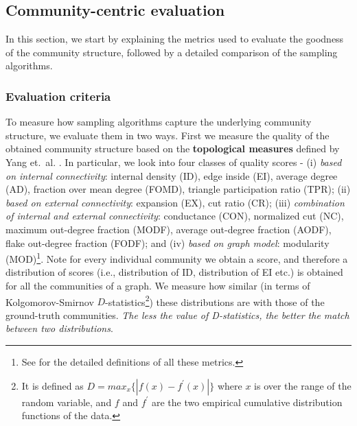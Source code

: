 \subsection{Community-centric evaluation}
In this section, we start by explaining the metrics used to evaluate the goodness of the community structure, followed by a detailed comparison of the sampling algorithms.
\subsubsection{Evaluation criteria}
To measure how sampling algorithms capture the underlying community structure, we evaluate them in two ways.  First we measure the quality of the obtained community structure based on the {\bf topological measures} defined by Yang et.~al.  \cite{yang2015defining}. In particular, we look into four classes of quality scores - (i) {\em based on internal connectivity}: internal density (ID), edge inside (EI), average degree (AD), fraction over mean degree (FOMD), triangle participation ratio (TPR); (ii) {\em based on external connectivity}: expansion (EX), cut ratio (CR); (iii) {\em combination of internal and external connectivity}: conductance (CON), normalized cut (NC), maximum out-degree fraction (MODF), average out-degree fraction (AODF), flake out-degree fraction (FODF); and (iv) {\em based on graph model}: modularity (MOD)\footnote{See \cite{yang2015defining} for the detailed definitions of all these metrics.}. Note for every individual community we obtain a score, and therefore a distribution of scores (i.e., distribution of ID, distribution of EI etc.) is obtained for all the communities of a graph. We measure how similar (in terms of Kolgomorov-Smirnov $D$-statistics\footnote{It is defined as $D = max_x\{|f(x) - f^{'}(x)|\}$ where $x$ is over the range of the random variable, and $f$ and $f^{'}$ are the two empirical cumulative distribution functions of the data.}) these distributions are with those of the ground-truth communities. {\em The less the value of D-statistics, the better the match between two distributions}.



